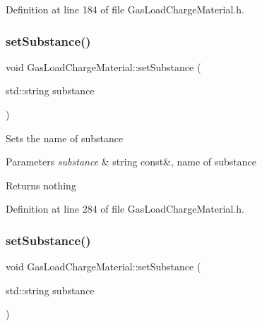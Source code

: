 Definition at line 184 of file Gas\+Load\+Charge\+Material.\+h.

\mbox{\label{class_gas_load_charge_material_a20cc3df601d8daae9b8f8e7b0c53c2e3}} 
\subsubsection{\texorpdfstring{set\+Substance()}{setSubstance()}\hspace{0.1cm}{\footnotesize\ttfamily [1/3]}}
{\footnotesize\ttfamily void Gas\+Load\+Charge\+Material\+::set\+Substance (\begin{DoxyParamCaption}\item[{std\+::string}]{substance }\end{DoxyParamCaption})\hspace{0.3cm}{\ttfamily [inline]}}

Sets the name of substance


\begin{DoxyParams}{Parameters}
{\em substance} & string const\&, name of substance\\
\hline
\end{DoxyParams}
\begin{DoxyReturn}{Returns}
nothing 
\end{DoxyReturn}


Definition at line 284 of file Gas\+Load\+Charge\+Material.\+h.

\mbox{\label{class_gas_load_charge_material_a20cc3df601d8daae9b8f8e7b0c53c2e3}} 
\subsubsection{\texorpdfstring{set\+Substance()}{setSubstance()}\hspace{0.1cm}{\footnotesize\ttfamily [2/3]}}
{\footnotesize\ttfamily void Gas\+Load\+Charge\+Material\+::set\+Substance (\begin{DoxyParamCaption}\item[{std\+::string}]{substance }\end{DoxyParamCaption})\hspace{0.3cm}{\ttfamily [inline]}}


